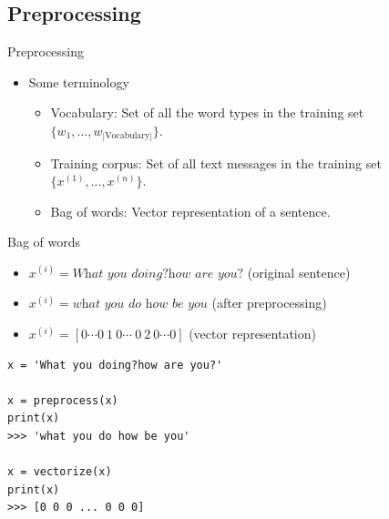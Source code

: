 \documentclass{beamer}
\begin{document}

\subsection{Preprocessing}

\begin{frame}{Preprocessing}
	\begin{itemize}
		\item Some terminology
		\begin{itemize}
			\item Vocabulary: Set of all the word types in the training set $\{w_1,...,w_{|\text{Vocabulary}|}\}$.
			\item Training corpus: Set of all text messages in the training set $\{x^{(1)},...,x^{(n)}\}$.
			\item Bag of words: Vector representation of a sentence.
		\end{itemize}
	\end{itemize}
\end{frame}

\begin{frame}[fragile]{Bag of words}
	\begin{itemize}
		\item $x^{(i)}=\textit{What you doing?how are you?}$ (original sentence)
		\item $x^{(i)}=\textit{what you do how be you}$ (after preprocessing)
		\item $x^{(i)}=[0\cdots0~1~0\cdots~0~2~0\cdots0]$ (vector representation)
	\end{itemize}
\begin{verbatim}
x = 'What you doing?how are you?'

x = preprocess(x)
print(x)
>>> 'what you do how be you'

x = vectorize(x)
print(x)
>>> [0 0 0 ... 0 0 0]
\end{verbatim}
\end{frame}
\end{document}
